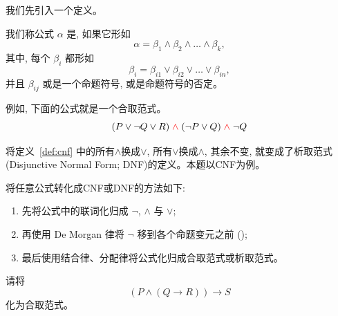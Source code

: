 \documentclass[a4paper, justified]{tufte-handout}
\begin{document}
\newpage
\begin{problem}[合取范式与析取范式]
  我们先引入一个定义。

  \begin{definition}
    \label{def:cnf}
    我们称公式 $\alpha$ 是, 如果它形如
    \[
      \alpha = \beta_{1} \land \beta_{2} \land \dots \land \beta_{k},
    \]
    其中, 每个 $\beta_{i}$ 都形如
    \[
      \beta_{i} = \beta_{i1} \lor \beta_{i2} \lor \dots \lor \beta_{in},
    \]
    并且 $\beta_{ij}$ 或是一个命题符号, 或是命题符号的否定。
  \end{definition}

  例如, 下面的公式就是一个合取范式。
  \[
    (P \lor \lnot Q \lor R) \;\textcolor{red}{\land}\; (\lnot P \lor Q) \;\textcolor{red}{\land}\; \lnot Q
  \]

  将定义~\ref{def:cnf} 中的所有$\land$换成$\lor$, 所有$\lor$换成$\land$, 其余不变,
  就变成了析取范式 (Disjunctive Normal Form; DNF)的定义。本题以CNF为例。

  将任意公式转化成CNF或DNF的方法如下:
  \begin{enumerate}[(1)]
    \item 先将公式中的联词化归成 $\lnot$, $\land$ 与 $\lor$;
    \item 再使用 De Morgan 律将 $\lnot$ 移到各个命题变元之前 ();
    \item 最后使用结合律、分配律将公式化归成合取范式或析取范式。
  \end{enumerate}

  请将
  \[
    (P \land (Q \to R)) \to S
  \]
  化为合取范式。
\end{problem}
\end{document}
